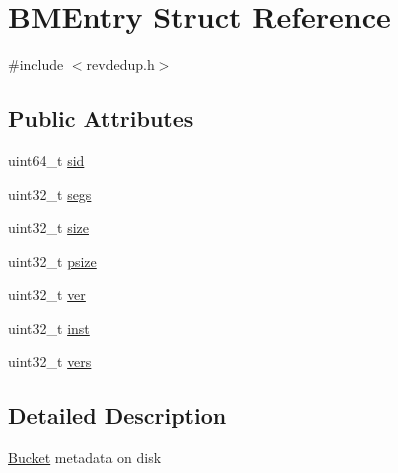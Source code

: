 \hypertarget{structBMEntry}{\section{\-B\-M\-Entry \-Struct \-Reference}
\label{structBMEntry}
}


{\ttfamily \#include $<$revdedup.\-h$>$}

\subsection*{\-Public \-Attributes}
\begin{DoxyCompactItemize}
\item 
uint64\-\_\-t \hyperlink{structBMEntry_a86084e47eeb55740eb5782b4e2c01010}{sid}
\item 
uint32\-\_\-t \hyperlink{structBMEntry_a223ee21a6a789e0ff7fbab0625f7958f}{segs}
\item 
uint32\-\_\-t \hyperlink{structBMEntry_adf6e7d636ace7973d4219f9cb2230cb5}{size}
\item 
uint32\-\_\-t \hyperlink{structBMEntry_ae3868e1dcdcb708366dc4a23b2f707ef}{psize}
\item 
uint32\-\_\-t \hyperlink{structBMEntry_aa83f08bc3da9de006644e89a3eeb28e8}{ver}
\item 
uint32\-\_\-t \hyperlink{structBMEntry_a49af9e59a07d208b45d4e40815b93488}{inst}
\item 
uint32\-\_\-t \hyperlink{structBMEntry_ae536aed7cbf92693d391fa7ab5c6c073}{vers}
\end{DoxyCompactItemize}


\subsection{\-Detailed \-Description}
\hyperlink{structBucket}{\-Bucket} metadata on disk 


